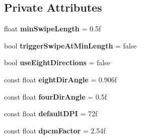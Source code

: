 \subsection*{Private Attributes}
\begin{DoxyCompactItemize}
\item 
\mbox{\label{class_swipe_manager_a4e7f7164b8adeafced7c5e32da625141}} 
float {\bfseries min\+Swipe\+Length} = 0.\+5f
\item 
\mbox{\label{class_swipe_manager_a4a20d05c6bcc8f9e2e85f99a9ad3126f}} 
bool {\bfseries trigger\+Swipe\+At\+Min\+Length} = false
\item 
\mbox{\label{class_swipe_manager_a99ba80c5e02da98d3bd8a026cd7547e6}} 
bool {\bfseries use\+Eight\+Directions} = false
\item 
\mbox{\label{class_swipe_manager_aa5d3cca7ac3b6c9f851d3478b7886e3a}} 
const float {\bfseries eight\+Dir\+Angle} = 0.\+906f
\item 
\mbox{\label{class_swipe_manager_ae996763d41a0b3417db718d9a74e8fe5}} 
const float {\bfseries four\+Dir\+Angle} = 0.\+5f
\item 
\mbox{\label{class_swipe_manager_adfa0317d2f847a83f88cc5d79be010ea}} 
const float {\bfseries default\+D\+PI} = 72f
\item 
\mbox{\label{class_swipe_manager_a478dbded620892962c8254d87b979cd9}} 
const float {\bfseries dpcm\+Factor} = 2.\+54f
\end{DoxyCompactItemize}
